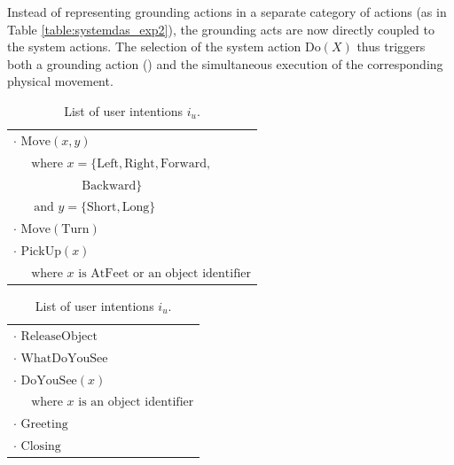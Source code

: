 Instead of representing grounding actions in a separate category of actions (as in Table \ref{table:systemdas_exp2}), the grounding acts are now directly coupled to the system actions. The selection of the system action $\mathrm{Do}(X)$ thus triggers both a grounding action () and the simultaneous execution of the corresponding physical movement. 

\renewcommand{\arraystretch}{1.3}

\begin{table}[p!]
\begin{footnotesize}
\begin{tabular}{p{60mm}} 
$\cdot$ $\mathrm{Move}(x,y) $ \\ $ \ \ \ \ \ \text{ where } x=\{\mathrm{Left,Right,Forward,}$ \\ $\ \ \ \ \ \ \ \ \ \ \ \ \ \ \ \ \ \ \ \ \ \ \ \ \ \mathrm{Backward}\} $ \\ $ \ \ \ \ \ \ \text{ and } y = \{\mathrm{Short, Long}\}$ \\
$\cdot$ $\mathrm{Move(Turn)} $ \\
$\cdot$ $\mathrm{PickUp}(x) $ \\ $\ \ \ \ \  \text{ where } x \text{ is }   \mathrm{AtFeet} \text{ or  an object identifier}$
\end{tabular}
\hspace{2cm}
\begin{tabular}{p{60mm}} 
$\cdot$ $\mathrm{ReleaseObject} $ \\
$\cdot$ $\mathrm{WhatDoYouSee}$ \\
$\cdot$ $\mathrm{DoYouSee}(x) $ \\ $\ \ \ \ \  \text{ where } x \text{ is an object identifier}$ \\
$\cdot$ $\mathrm{Greeting}$ \\
$\cdot$ $\mathrm{Closing}$ 
\end{tabular}
\end{footnotesize}
 \caption{List of user intentions $i_u$.} 
\label{table:userintents_exp3}
\end{table}


